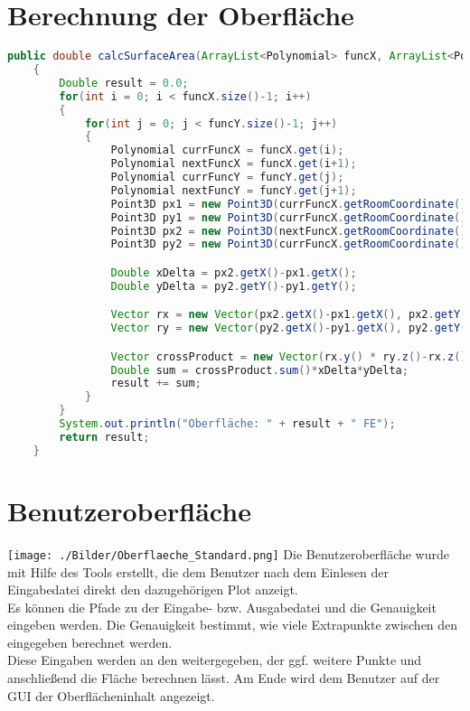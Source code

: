 \documentclass[11pt, bibliography=totocnumbered]{scrartcl}
\begin{document}
\section{Berechnung der Oberfl\"ache}
\begin{lstlisting}[caption={}, label={lst:label}, language=Java]
    public double calcSurfaceArea(ArrayList<Polynomial> funcX, ArrayList<Polynomial> funcY)
    {
        Double result = 0.0;
        for(int i = 0; i < funcX.size()-1; i++)
        {
            for(int j = 0; j < funcY.size()-1; j++)
            {
                Polynomial currFuncX = funcX.get(i);
                Polynomial nextFuncX = funcX.get(i+1);
                Polynomial currFuncY = funcY.get(j);
                Polynomial nextFuncY = funcY.get(j+1);
                Point3D px1 = new Point3D(currFuncX.getRoomCoordinate(), currFuncY.getRoomCoordinate(), currFuncX.derivation(currFuncY.getRoomCoordinate()));
                Point3D py1 = new Point3D(currFuncX.getRoomCoordinate(), currFuncY.getRoomCoordinate(), currFuncY.derivation(currFuncX.getRoomCoordinate()));
                Point3D px2 = new Point3D(nextFuncX.getRoomCoordinate(), currFuncY.getRoomCoordinate(), nextFuncX.derivation(currFuncY.getRoomCoordinate()));
                Point3D py2 = new Point3D(currFuncX.getRoomCoordinate(), nextFuncY.getRoomCoordinate(), nextFuncY.derivation(currFuncX.getRoomCoordinate()));

                Double xDelta = px2.getX()-px1.getX();
                Double yDelta = py2.getY()-py1.getY();

                Vector rx = new Vector(px2.getX()-px1.getX(), px2.getY()-px1.getY(), px2.getZ()-px1.getZ());
                Vector ry = new Vector(py2.getX()-py1.getX(), py2.getY()-py1.getY(), py2.getZ()-py1.getZ());

                Vector crossProduct = new Vector(rx.y() * ry.z()-rx.z()*ry.y(),rx.z()*ry.x()-rx.x()*ry.z(), rx.x()*ry.y()-rx.y()*ry.x());
                Double sum = crossProduct.sum()*xDelta*yDelta;
                result += sum;
            }
        }
        System.out.println("Oberfläche: " + result + " FE");
        return result;
    }
\end{lstlisting}
\section{Benutzeroberfl\"ache}
\hspace*{1cm}
\texttt{[image: ./Bilder/Oberflaeche\_Standard.png]}
\newline
Die Benutzeroberfl\"ache wurde mit Hilfe des Tools  erstellt, die dem Benutzer nach dem Einlesen der Eingabedatei direkt den dazugeh\"origen Plot anzeigt. \\ 
Es k\"onnen die Pfade zu der Eingabe- bzw. Ausgabedatei und die Genauigkeit eingeben werden. Die Genauigkeit bestimmt, wie viele Extrapunkte zwischen den eingegeben berechnet werden. \\
Diese Eingaben werden an den  weitergegeben, der ggf. weitere Punkte und anschlie{\ss}end die Fl\"ache berechnen l\"asst. Am Ende wird dem Benutzer auf der GUI der Oberfl\"acheninhalt angezeigt. 
\end{document}
